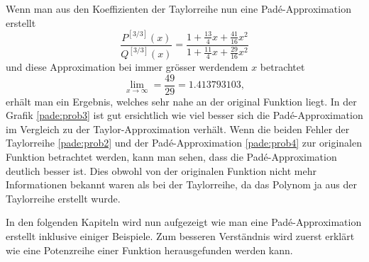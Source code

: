 Wenn man aus den Koeffizienten der Taylorreihe nun eine Padé-Approximation erstellt 
\begin{equation*}
\frac{P^{[3/3]}(x)}{Q^{[3/3]}(x)}
=
\frac{1+\frac{13}{4}x+\frac{41}{16}x^2}{1 + \frac{11}{4}x + \frac{29}{16}x^2} 
\end{equation*}
und diese Approximation bei immer grösser werdendem $x$ betrachtet
\begin{equation*}
\lim_{x \to \infty}
=
\frac{49}{29} = 1.413793103,
\end{equation*}
erhält man ein Ergebnis, welches sehr nahe an der original Funktion liegt. 
In der Grafik \ref{pade:prob3} ist gut ersichtlich wie viel besser sich die Padé-Approximation im Vergleich zu der Taylor-Approximation verhält.
Wenn die beiden Fehler der Taylorreihe \ref{pade:prob2} und der Padé-Approximation \ref{pade:prob4} zur originalen Funktion betrachtet werden, kann man sehen, dass die Padé-Approximation deutlich besser ist.
Dies obwohl von der originalen Funktion nicht mehr Informationen bekannt waren als bei der Taylorreihe, da das Polynom ja aus der Taylorreihe erstellt wurde.

In den folgenden Kapiteln wird nun aufgezeigt wie man eine Padé-Approximation erstellt inklusive einiger Beispiele.
Zum besseren Verständnis wird zuerst erklärt wie eine Potenzreihe einer Funktion herausgefunden werden kann.










